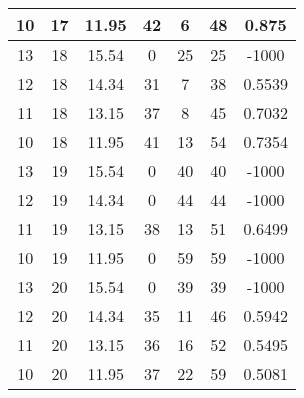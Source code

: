 \documentclass[letterpaper, 12pt]{article}
\begin{document}
\begin{longtable}{|c|c|c|c|c|c|c|}
\hline
10 & 17 & 11.95 & 42 & 6 & 48 & 0.875 \\
\hline
13 & 18 & 15.54 & 0 & 25 & 25 & -1000 \\
\hline
12 & 18 & 14.34 & 31 & 7 & 38 & 0.5539 \\
\hline
11 & 18 & 13.15 & 37 & 8 & 45 & 0.7032 \\
\hline
10 & 18 & 11.95 & 41 & 13 & 54 & 0.7354 \\
\hline
13 & 19 & 15.54 & 0 & 40 & 40 & -1000 \\
\hline
12 & 19 & 14.34 & 0 & 44 & 44 & -1000 \\
\hline
11 & 19 & 13.15 & 38 & 13 & 51 & 0.6499 \\
\hline
10 & 19 & 11.95 & 0 & 59 & 59 & -1000 \\
\hline
13 & 20 & 15.54 & 0 & 39 & 39 & -1000 \\
\hline
12 & 20 & 14.34 & 35 & 11 & 46 & 0.5942 \\
\hline
11 & 20 & 13.15 & 36 & 16 & 52 & 0.5495 \\
\hline
10 & 20 & 11.95 & 37 & 22 & 59 & 0.5081 \\
\hline
\end{longtable}
\end{document}
